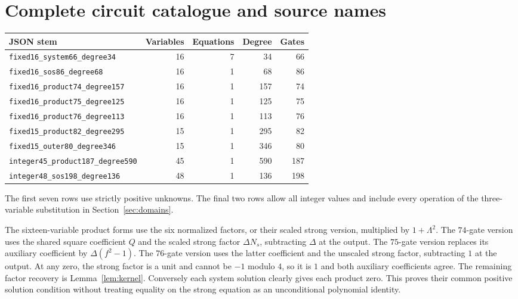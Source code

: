 \documentclass[11pt]{article}
\theoremstyle{remark}\newtheorem{remark}[theorem]{Remark}
\begin{document}
\appendix
\section{Complete circuit catalogue and source names}

\begin{center}\small
\begin{tabular}{lrrrr}
\toprule
JSON stem & Variables & Equations & Degree & Gates\\
\midrule
\texttt{fixed16\_system66\_degree34} &16&7&34&66\\
\texttt{fixed16\_sos86\_degree68} &16&1&68&86\\
\texttt{fixed16\_product74\_degree157} &16&1&157&74\\
\texttt{fixed16\_product75\_degree125} &16&1&125&75\\
\texttt{fixed16\_product76\_degree113} &16&1&113&76\\
\texttt{fixed15\_product82\_degree295} &15&1&295&82\\
\texttt{fixed15\_outer80\_degree346} &15&1&346&80\\
\midrule
\texttt{integer45\_product187\_degree590} &45&1&590&187\\
\texttt{integer48\_sos198\_degree136} &48&1&136&198\\
\bottomrule
\end{tabular}\end{center}

The first seven rows use strictly positive unknowns. The final two rows allow all integer values and include every operation of the three-variable substitution in Section~\ref{sec:domains}.

The sixteen-variable product forms use the six normalized factors, or their scaled strong version, multiplied by $1+\Lambda^2$. The $74$-gate version uses the shared square coefficient $Q$ and the scaled strong factor $\Delta N_s$, subtracting $\Delta$ at the output. The $75$-gate version replaces its auxiliary coefficient by $\Delta(f^2-1)$. The $76$-gate version uses the latter coefficient and the unscaled strong factor, subtracting $1$ at the output. At any zero, the strong factor is a unit and cannot be $-1$ modulo $4$, so it is $1$ and both auxiliary coefficients agree. The remaining factor recovery is Lemma~\ref{lem:kernel}. Conversely each system solution clearly gives each product zero. This proves their common positive solution condition without treating equality on the strong equation as an unconditional polynomial identity.
\end{document}
